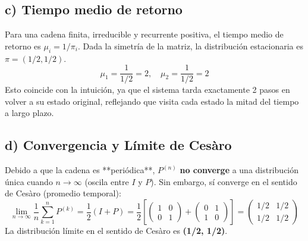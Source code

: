 \documentclass[letterpaper, 12pt]{article}
\begin{document}
    \subsection*{c) Tiempo medio de retorno}
    Para una cadena finita, irreducible y recurrente positiva, el tiempo medio de retorno es $\mu_i = 1/\pi_i$. Dada la simetría de la matriz, la distribución estacionaria es $\pi = (1/2, 1/2)$.
    \[ \mu_1 = \frac{1}{1/2} = 2, \quad \mu_2 = \frac{1}{1/2} = 2 \]
    Esto coincide con la intuición, ya que el sistema tarda exactamente 2 pasos en volver a su estado original, reflejando que visita cada estado la mitad del tiempo a largo plazo.

    \subsection*{d) Convergencia y Límite de Cesàro}
    Debido a que la cadena es **periódica**, $P^{(n)}$ \textbf{no converge} a una distribución única cuando $n \to \infty$ (oscila entre $I$ y $P$). Sin embargo, sí converge en el sentido de Cesàro (promedio temporal):
    \[
    \lim_{n \to \infty} \frac{1}{n} \sum_{k=1}^{n} P^{(k)} = \frac{1}{2} (I + P) = \frac{1}{2} \left[ \begin{pmatrix} 1 & 0 \\ 0 & 1 \end{pmatrix} + \begin{pmatrix} 0 & 1 \\ 1 & 0 \end{pmatrix} \right] = \begin{pmatrix} 1/2 & 1/2 \\ 1/2 & 1/2 \end{pmatrix}
    \]
    La distribución límite en el sentido de Cesàro es \textbf{(1/2, 1/2)}.
    
\end{document}
